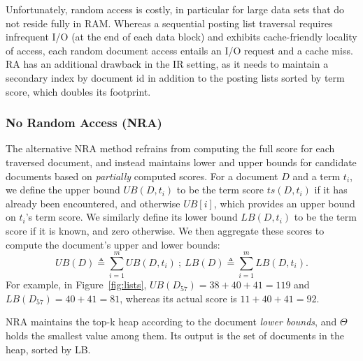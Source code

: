 Unfortunately, random access is costly,  in particular for large data sets that do not reside fully in RAM.
Whereas a sequential posting list traversal requires infrequent I/O (at the end of each data block) and exhibits cache-friendly locality of access,  each random document access entails an I/O request and a cache miss.  
RA has an additional drawback in the IR setting, as it needs to maintain a secondary index by document id in addition to the posting lists sorted by term score, which doubles its footprint. 

\subsubsection{No Random Access (NRA)} 
The alternative NRA method %
refrains from computing the full score for each traversed document, and instead
maintains lower and upper bounds for candidate documents based on {\em partially\/} computed scores. 
For a document $D$ and a term $t_i$, we define the upper bound $UB(D, t_i)$ to be the term score $ts(D, t_i)$ if it has already been encountered, and otherwise $UB[i]$, which provides an upper bound on $t_i$'s term score. We similarly define its lower bound $LB(D, t_i)$ to be the term score if it is known, and zero otherwise. We then aggregate these scores to compute the document's upper and lower bounds:
\[
UB(D) \triangleq \sum_{i=1}^m UB(D, t_i) \ ; \  
LB(D) \triangleq \sum_{i=1}^m LB(D, t_i).
\] 
For example, in Figure~\ref{fig:lists}, $UB(D_{57}) = 38+40+41 = 119$ and $LB(D_{57}) = 40+41 = 81$, whereas its actual score  is $11+ 40+41 = 92$.

NRA maintains the top-k heap according to the document \emph{lower bounds}, and $\Theta$ holds the smallest value among them. 
Its output is the set of documents in the heap, sorted by LB.

